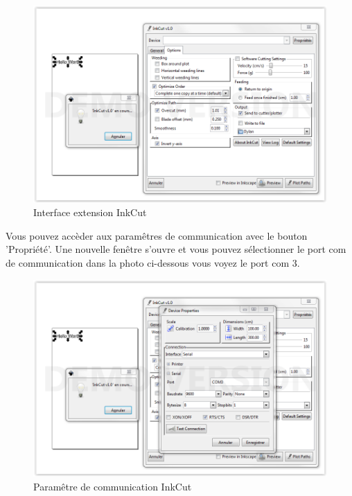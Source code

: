 \documentclass[a4paper,oneside,12pt]{report}
\begin{document}
\begin{figure}[h]
 \begin{center}
  \includegraphics[width=13cm]{imgs/inkcut.png}
  \caption{ Interface extension InkCut }
 \end{center}
\end{figure}
\newpage
Vous pouvez accèder aux paramêtres de communication avec le bouton 'Propriété'. Une nouvelle fenêtre s'ouvre et vous pouvez sélectionner
le port com de communication dans la photo ci-dessous vous voyez le port com 3.

\begin{figure}[h]
 \begin{center}
  \includegraphics[width=15cm]{imgs/inkcutParam.png}
  \caption{ Paramêtre de communication InkCut }
 \end{center}
\end{figure}
\end{document}
